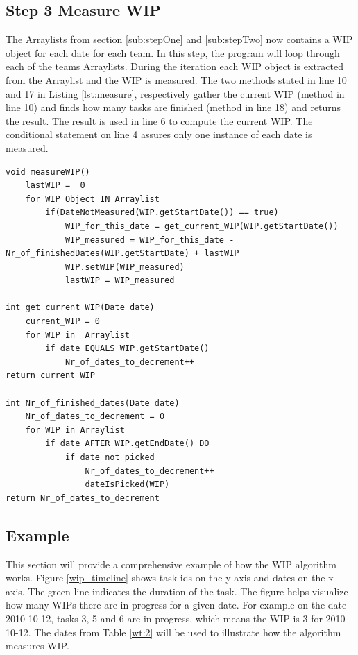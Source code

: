 \documentclass[UKenglish]{ifimaster}  %
\begin{document}
\subsection{Step 3 Measure WIP}
\vspace{-2.0em}
The Arraylists from section \ref{sub:stepOne}  and \ref{sub:stepTwo} now contains a WIP object for each date for each team. In this step, the program will loop through each of the teams Arraylists. During the iteration each WIP object is extracted from the Arraylist and the WIP is measured. The two methods stated in line 10 and 17 in Listing \ref{lst:measure}, respectively gather the current WIP (method in line 10) and finds how many tasks are finished (method in line 18) and returns the result. The result is used in line 6 to compute the current WIP. The conditional statement on line 4 assures only one instance of each date is measured. 
\begin{minipage}{\textwidth} 
\begin{lstlisting}[caption={WIP measurement},label={lst:measure}]
void measureWIP()
	lastWIP =  0
	for WIP Object IN Arraylist	
		if(DateNotMeasured(WIP.getStartDate()) == true)
			WIP_for_this_date = get_current_WIP(WIP.getStartDate())  
			WIP_measured = WIP_for_this_date - Nr_of_finishedDates(WIP.getStartDate) + lastWIP
			WIP.setWIP(WIP_measured)
			lastWIP = WIP_measured 

int get_current_WIP(Date date)
	current_WIP = 0
	for WIP in  Arraylist
		if date EQUALS WIP.getStartDate()
			Nr_of_dates_to_decrement++
return current_WIP
			 	
int Nr_of_finished_dates(Date date)
	Nr_of_dates_to_decrement = 0
	for WIP in Arraylist
		if date AFTER WIP.getEndDate() DO
			if date not picked
				Nr_of_dates_to_decrement++
				dateIsPicked(WIP)				
return Nr_of_dates_to_decrement 
 \end{lstlisting}
  \end{minipage}

\subsection{Example}
\label{sec:Example}
This section will provide a comprehensive example of how the WIP algorithm works.  
Figure \ref{wip_timeline}  shows task ids on the y-axis and dates on the x-axis. The green line indicates the duration of the task. The figure helps  visualize how many WIPs there are in progress for a given date. For example on the date 2010-10-12, tasks 3, 5 and 6 are in progress, which means the WIP is 3 for 2010-10-12. The dates from Table \ref{wt:2}  will be used to illustrate how the algorithm measures WIP.
\end{document}
